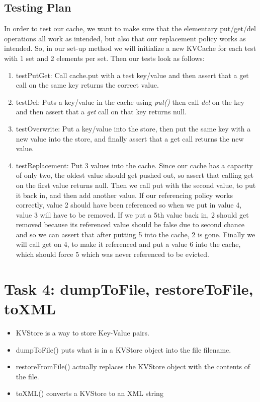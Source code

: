 \documentclass{article}
\begin{document}
\subsection*{Testing Plan}
In order to test our cache, we want to make sure that the elementary put/get/del operations
all work as intended, but also that our replacement policy works as intended. So, in our
set-up method we will initialize a new KVCache for each test with 1 set and 2 elements per set.
Then our tests look as follows:
\begin{enumerate}
\item testPutGet: Call cache.put with a test key/value and then assert that a get call on the same key
returns the correct value.
\item testDel: Puts a key/value in the cache using \textit{put()} then call \textit{del} on the key and then
assert that a \textit{get} call on that key returns null.
\item testOverwrite: Put a key/value into the store, then put the same key with a new value into the store, and
finally assert that a get call returns the new value.
\item testReplacement: Put 3 values into the cache. Since our cache has a capacity of only two, the oldest value
should get pushed out, so assert that calling get on the first value returns null. Then we call put with the second
value, to put it back in, and then add another value. If our referencing policy works correctly, value 2 should have
been referenced so when we put in value 4, value 3 will have to be removed. If we put a 5th value back in, 2 should get
removed because its referenced value should be false due to second chance and so we can assert that after putting 5 into
the cache, 2 is gone. Finally we will call get on 4, to make it referenced and put a value 6 into the cache, which
should force 5 which was never referenced to be evicted.
\end{enumerate}

\section*{Task 4: dumpToFile, restoreToFile, toXML}
\begin{itemize}
\item KVStore is a way to store Key-Value pairs.
\item dumpToFile() puts what is in a KVStore object into the file filename.
\item restoreFromFile() actually replaces the KVStore object with the contents of the file.
\item toXML() converts a KVStore to an XML string
\end{itemize}
\end{document}
